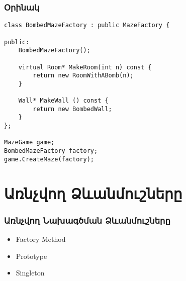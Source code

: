 \documentclass{beamer}
\begin{document}
\begin{frame}[fragile]\frametitle{Օրինակ}
\begin{english}
\begin{verbatim}
class BombedMazeFactory : public MazeFactory {

public:
    BombedMazeFactory();

    virtual Room* MakeRoom(int n) const {
        return new RoomWithABomb(n);
    }

    Wall* MakeWall () const {
        return new BombedWall;
    }
};

MazeGame game;
BombedMazeFactory factory;
game.CreateMaze(factory);
\end{verbatim}
\end{english}
\end{frame}

\section{Առնչվող Ձևանմուշները}
\begin{frame}\frametitle{Առնչվող Նախագծման Ձևանմուշները}
\begin{itemize}
    \item Factory Method \vfill
    \item Prototype \vfill
    \item Singleton
\end{itemize}
\end{frame}
\end{document}
